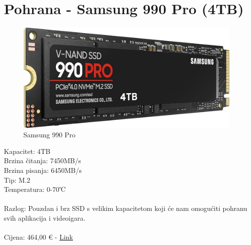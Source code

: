 \documentclass{report}
\begin{document}
\section{Pohrana - Samsung 990 Pro (4TB)}
\begin{figure}[H]
    \centering
    \includegraphics[scale=0.22]{Slike/ssd.jpg}
    \caption{Samsung 990 Pro}
    \label{fig:ssd}
\end{figure}
Kapacitet: 4TB\\Brzina čitanja: 7450MB/s\\Brzina pisanja: 6450MB/s\\Tip: M.2\\Temperatura: 0-70℃\\\\Razlog: Pouzdan i brz SSD s velikim kapacitetom koji će nam omogućiti pohranu svih aplikacija i videoigara.\\\\Cijena: 464,00 € - \href{https://www.uzishop.hr/-ssd-m2-pcie-40/129836-ssd-4tb-m2-80mm-pci-e-40-x4-nvme-v-nand-samsung-990-pro-mz-v9p4t0bw.html}{Link}

\pagebreak
\end{document}

